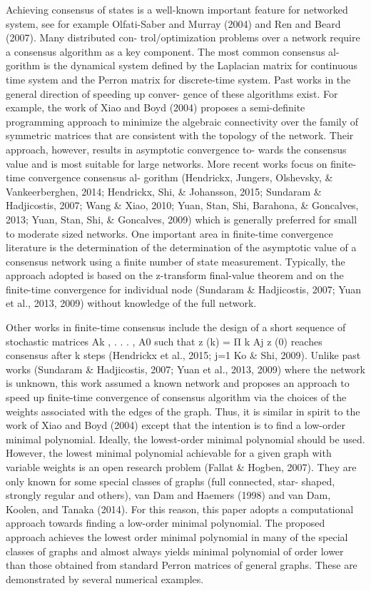 \documentclass{article}
\begin{document}
Achieving consensus of states is a well-known important feature for networked system, see for example Olfati-Saber and Murray (2004) and Ren and Beard (2007). Many distributed con- trol/optimization problems over a network require a consensus algorithm as a key component. The most common consensus al- gorithm is the dynamical system defined by the Laplacian matrix for continuous time system and the Perron matrix for discrete-time system. Past works in the general direction of speeding up conver- gence of these algorithms exist. For example, the work of Xiao and Boyd (2004) proposes a semi-definite programming approach to minimize the algebraic connectivity over the family of symmetric matrices that are consistent with the topology of the network. Their approach, however, results in asymptotic convergence to- wards the consensus value and is most suitable for large networks. More recent works focus on finite-time convergence consensus al- gorithm (Hendrickx, Jungers, Olshevsky, \& Vankeerberghen, 2014; Hendrickx, Shi, \& Johansson, 2015; Sundaram \& Hadjicostis, 2007; Wang \& Xiao, 2010; Yuan, Stan, Shi, Barahona, \& Goncalves, 2013; Yuan, Stan, Shi, \& Goncalves, 2009) which is generally preferred for small to moderate sized networks. One important area in finite-time convergence literature is the determination of the determination of the asymptotic value of a consensus network using a finite number of state measurement. Typically, the approach adopted is based on the z-transform final-value theorem and on the finite-time convergence for individual node (Sundaram \& Hadjicostis, 2007; Yuan et al., 2013, 2009) without knowledge of the full network.

Other works in finite-time consensus include the design of a
short sequence of stochastic matrices Ak , . . . , A0 such that z (k) =
Π k Aj z (0) reaches consensus after k steps (Hendrickx et al., 2015; j=1
Ko \& Shi, 2009).
Unlike past works (Sundaram \& Hadjicostis, 2007; Yuan et al.,
2013, 2009) where the network is unknown, this work assumed a known network and proposes an approach to speed up finite-time convergence of consensus algorithm via the choices of the weights associated with the edges of the graph. Thus, it is similar in spirit to the work of Xiao and Boyd (2004) except that the intention is to find a low-order minimal polynomial. Ideally, the lowest-order minimal polynomial should be used. However, the lowest minimal polynomial achievable for a given graph with variable weights is an open research problem (Fallat \& Hogben, 2007). They are only known for some special classes of graphs (full connected, star- shaped, strongly regular and others), van Dam and Haemers (1998) and van Dam, Koolen, and Tanaka (2014). For this reason, this paper adopts a computational approach towards finding a low-order minimal polynomial. The proposed approach achieves the lowest order minimal polynomial in many of the special classes of graphs and almost always yields minimal polynomial of order lower than those obtained from standard Perron matrices of general graphs. These are demonstrated by several numerical examples.
\end{document}
